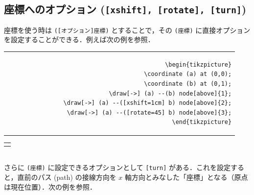\documentclass[lualatex]{jlreq}
\begin{document}
\subsection{座標へのオプション (\texttt{[xshift], [rotate], [turn]})}

座標を使う時は \verb|([オプション]座標)| とすることで，その \verb|(座標)| に直接オプションを設定することができる．例えば次の例を参照．
\\[0.5em]
\begin{minipage}{0.64 \textwidth}
    \begin{flushright}
        \begin{tabular}{r}
            \begin{lstlisting}[language={[LaTeX] TeX},
            numbers=none,breaklines=true,gobble=12,frame=none]
            \begin{tikzpicture}
                \coordinate (a) at (0,0);
                \coordinate (b) at (0,1);
                \draw[->] (a) --(b) node[above]{1};
                \draw[->] (a) --([xshift=1cm] b) node[above]{2};
                \draw[->] (a) --([rotate=45] b) node[above]{3};
            \end{tikzpicture}
            \end{lstlisting}
        \end{tabular}
    \end{flushright}
\end{minipage}
\begin{minipage}{0.28 \textwidth}
    \begin{flushleft}
        \begin{tabular}{l}
            \begin{tikzpicture}
                \coordinate (a) at (0,0);
                \coordinate (b) at (0,1);
                \draw[->] (a) --(b) node[above]{1};
                \draw[->] (a) --([xshift=1cm] b) node[above]{2};
                \draw[->] (a) --([rotate=45] b) node[above]{3};
            \end{tikzpicture}
        \end{tabular}
    \end{flushleft}
\end{minipage}
\hfill
\\[1em]
さらに \verb|(座標)| に設定できるオプションとして \verb|[turn]| がある．これを設定すると，直前のパス (path) の接線方向を \(x \) 軸方向とみなした「座標」となる（原点は現在位置）．次の例を参照．
\\[0.5em]
\end{document}
